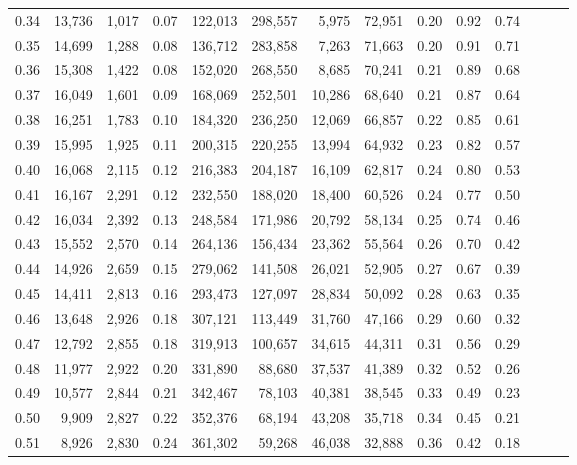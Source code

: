 \begin{tabular}{rrrrrrrrrrrrrr}
0.34 &  13,736 &  1,017 &  0.07 &  122,013 &  298,557 &   5,975 &  72,951 &  0.20 &  0.92 &      0.74 \\
0.35 &  14,699 &  1,288 &  0.08 &  136,712 &  283,858 &   7,263 &  71,663 &  0.20 &  0.91 &      0.71 \\
0.36 &  15,308 &  1,422 &  0.08 &  152,020 &  268,550 &   8,685 &  70,241 &  0.21 &  0.89 &      0.68 \\
0.37 &  16,049 &  1,601 &  0.09 &  168,069 &  252,501 &  10,286 &  68,640 &  0.21 &  0.87 &      0.64 \\
0.38 &  16,251 &  1,783 &  0.10 &  184,320 &  236,250 &  12,069 &  66,857 &  0.22 &  0.85 &      0.61 \\
0.39 &  15,995 &  1,925 &  0.11 &  200,315 &  220,255 &  13,994 &  64,932 &  0.23 &  0.82 &      0.57 \\
0.40 &  16,068 &  2,115 &  0.12 &  216,383 &  204,187 &  16,109 &  62,817 &  0.24 &  0.80 &      0.53 \\
0.41 &  16,167 &  2,291 &  0.12 &  232,550 &  188,020 &  18,400 &  60,526 &  0.24 &  0.77 &      0.50 \\
0.42 &  16,034 &  2,392 &  0.13 &  248,584 &  171,986 &  20,792 &  58,134 &  0.25 &  0.74 &      0.46 \\
0.43 &  15,552 &  2,570 &  0.14 &  264,136 &  156,434 &  23,362 &  55,564 &  0.26 &  0.70 &      0.42 \\
0.44 &  14,926 &  2,659 &  0.15 &  279,062 &  141,508 &  26,021 &  52,905 &  0.27 &  0.67 &      0.39 \\
0.45 &  14,411 &  2,813 &  0.16 &  293,473 &  127,097 &  28,834 &  50,092 &  0.28 &  0.63 &      0.35 \\
0.46 &  13,648 &  2,926 &  0.18 &  307,121 &  113,449 &  31,760 &  47,166 &  0.29 &  0.60 &      0.32 \\
0.47 &  12,792 &  2,855 &  0.18 &  319,913 &  100,657 &  34,615 &  44,311 &  0.31 &  0.56 &      0.29 \\
0.48 &  11,977 &  2,922 &  0.20 &  331,890 &   88,680 &  37,537 &  41,389 &  0.32 &  0.52 &      0.26 \\
0.49 &  10,577 &  2,844 &  0.21 &  342,467 &   78,103 &  40,381 &  38,545 &  0.33 &  0.49 &      0.23 \\
0.50 &   9,909 &  2,827 &  0.22 &  352,376 &   68,194 &  43,208 &  35,718 &  0.34 &  0.45 &      0.21 \\
0.51 &   8,926 &  2,830 &  0.24 &  361,302 &   59,268 &  46,038 &  32,888 &  0.36 &  0.42 &      0.18 \\

\end{tabular}
